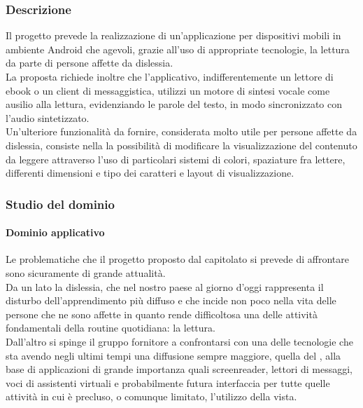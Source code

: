 		\subsubsection{Descrizione}
		Il progetto prevede la realizzazione di un'applicazione per dispositivi mobili in ambiente Android che agevoli, grazie all'uso di appropriate tecnologie, 
		la lettura da parte di persone affette da dislessia.
		\\La proposta richiede inoltre che l'applicativo, indifferentemente un lettore di ebook o un client di messaggistica, utilizzi un motore di sintesi 
		vocale come ausilio alla lettura, evidenziando le parole del testo, in modo sincronizzato con l'audio sintetizzato. 
		\\Un'ulteriore funzionalità da fornire, considerata molto utile per persone affette da dislessia, consiste nella la possibilità di 
		modificare la visualizzazione del contenuto da leggere attraverso l'uso di particolari sistemi di colori, spaziature fra lettere, differenti dimensioni 
		e tipo dei caratteri e layout di visualizzazione.
		\subsubsection{Studio del dominio}
			\paragraph{Dominio applicativo}
			Le problematiche che il progetto proposto dal capitolato si prevede di affrontare sono sicuramente di grande attualità.
			\\Da un lato la dislessia, che nel nostro paese al giorno d'oggi rappresenta il disturbo dell'apprendimento più diffuso e che incide non poco nella 
			vita delle persone che ne sono affette in quanto rende difficoltosa una delle attività fondamentali della routine quotidiana: la lettura. 
			\\Dall'altro si spinge il gruppo fornitore a confrontarsi con una delle tecnologie che sta avendo negli ultimi tempi una diffusione sempre 
			maggiore, quella del , alla base di applicazioni di grande importanza quali screenreader, lettori di messaggi, voci di 
			assistenti virtuali e probabilmente futura interfaccia per tutte quelle attività in cui è precluso, o comunque limitato, l'utilizzo della vista.
